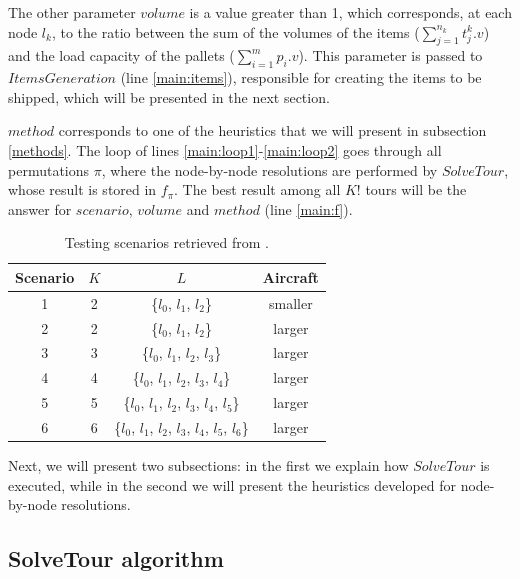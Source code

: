 \documentclass[preprint,authoryear]{elsarticle}
\begin{document}
The other parameter $volume$\/ is a value greater than 1, which corresponds, at each node $l_k$, to the ratio between the sum of the volumes of the items ($\sum_{j=1}^{n_k} t^k_j.v$) and the load capacity of the pallets ($\sum_{i=1}^{m} p_i.v$). This parameter is passed to $ItemsGeneration$ (line \ref{main:items}), responsible for creating the items to be shipped, which will be presented in the next section.

$method$\/ corresponds to one of the heuristics that we will present in subsection \ref{methods}. The loop of lines \ref{main:loop1}-\ref{main:loop2} goes through all permutations $\pi$, where the node-by-node resolutions are performed by $SolveTour$, whose result is stored in $f_{\pi}$. The best result among all $K!$\/ tours will be the answer for $scenario$, $volume$\/ and $method$\/ (line \ref{main:f}). 

\vspace{2.0mm}
\begin{table}[H]
	\centering
	\caption{Testing scenarios retrieved from \cite{MesquitaSanches2023}.}  \label{tab:scenarios}
	\begin{tabular}{c c c c }
		\toprule
		{\bf Scenario} & {$K$} & {$L$} & {\bf Aircraft} \\		
		\midrule
		1 & 2    & \{$l_0$, $l_1$, $l_2$\}                                 & smaller \\
		2 & 2    & \{$l_0$, $l_1$, $l_2$\}                                 & larger  \\
		3 & 3    & \{$l_0$, $l_1$, $l_2$, $l_3$\}                          & larger  \\
		4 & 4    & \{$l_0$, $l_1$, $l_2$, $l_3$, $l_4$\}                   & larger  \\
		5 & 5    & \{$l_0$, $l_1$, $l_2$, $l_3$, $l_4$, $l_5$\}            & larger  \\
		6 & 6    & \{$l_0$, $l_1$, $l_2$, $l_3$, $l_4$, $l_5$, $l_6$\}     & larger  \\
		\bottomrule
	\end{tabular}
\end{table}

Next, we will present two subsections: in the first we explain how $SolveTour$ is executed, while in the second we will present the heuristics developed for node-by-node resolutions.


\subsection{SolveTour algorithm}
\label{tour}
\end{document}
